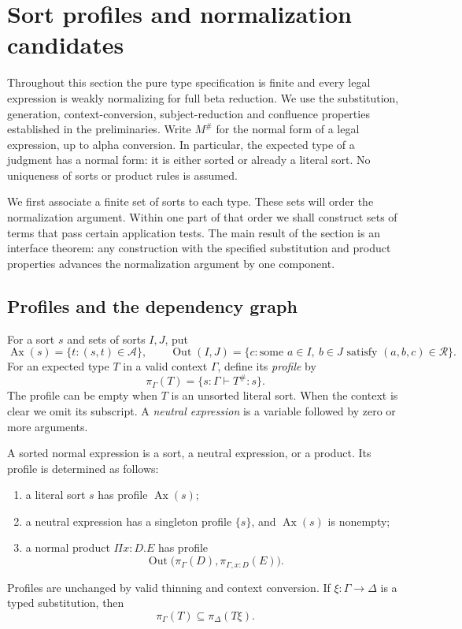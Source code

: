
\section{Sort profiles and normalization candidates}
\label{sec:profiles}

Throughout this section the pure type specification is finite and every
legal expression is weakly normalizing for full beta reduction. We use
the substitution, generation, context-conversion, subject-reduction and
confluence properties established in the preliminaries. Write $M^\#$
for the normal form of a legal expression, up to alpha conversion.
In particular, the expected type of a judgment has a normal form: it is
either sorted or already a literal sort. No uniqueness of sorts or
product rules is assumed.

We first associate a finite set of sorts to each type. These sets will
order the normalization argument. Within one part of that order we
shall construct sets of terms that pass certain application tests. The
main result of the section is an interface theorem: any construction
with the specified substitution and product properties advances the
normalization argument by one component.

\subsection{Profiles and the dependency graph}

For a sort $s$ and sets of sorts $I,J$, put
\[
 \operatorname{Ax}(s)=\{t:(s,t)\in\mathcal A\},\qquad
 \operatorname{Out}(I,J)
 =\{c:\text{some }a\in I,\ b\in J\text{ satisfy }(a,b,c)\in\mathcal R\}.
\]
For an expected type $T$ in a valid context $\Gamma$, define its
\emph{profile} by
\[
             \pi_\Gamma(T)=\{s:\Gamma\vdash T^\#:s\}.
\]
The profile can be empty when $T$ is an unsorted literal sort. When the
context is clear we omit its subscript. A \emph{neutral expression} is
a variable followed by zero or more arguments.

\begin{lemma}
\label{lem:normal-profiles}
A sorted normal expression is a sort, a neutral expression, or a
product. Its profile is determined as follows:
\begin{enumerate}
\item a literal sort $s$ has profile $\operatorname{Ax}(s)$;
\item a neutral expression has a singleton profile $\{s\}$, and
      $\operatorname{Ax}(s)$ is nonempty;
\item a normal product $\Pi x:D.E$ has profile
\[
 \operatorname{Out}\bigl(\pi_\Gamma(D),
                         \pi_{\Gamma,x:D}(E)\bigr).
\]
\end{enumerate}
Profiles are unchanged by valid thinning and context conversion.
If $\xi:\Gamma\to\Delta$ is a typed substitution, then
\begin{equation}
                  \pi_\Gamma(T)
                    \subseteq\pi_\Delta(T\xi).
\label{eq:profile-growth}
\end{equation}
\end{lemma}

